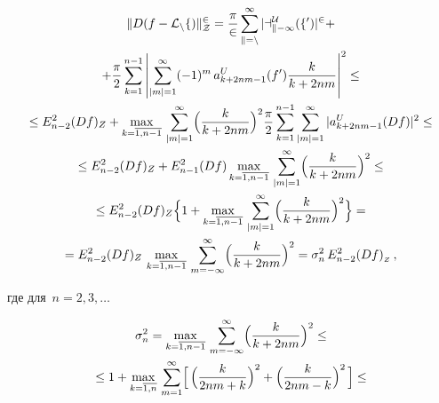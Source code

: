 \begin{pf}
\begin{gather}
\|D(f-\cal{L}_nf)\|_Z^2=\frac{\pi }{2}\sum_{k=n}^\infty


|a_{k-1}^U(f')|^2+\notag\\


%


+\frac{\pi}{2}\sum_{k=1}^{n-1}\left| \sum_{|m|=1}^\infty (-1)^m\,


a^U_{k+2nm-1}(f')\frac{k}{k+2nm}\right|^2\le\notag\\


%


\le E_{n-2}^2(Df)_Z+\max_{k=\overline{1,n-1}}\,


\sum_{|m|=1}^\infty \Bigl( \frac{k}{k+2nm}\Bigr)^2 


\frac{\pi }{2}\sum_{k=1}^{n-1}\sum_{|m|=1}^\infty |a^U_{k+2nm-1}(Df)|^2\le


\notag\\


%


\le E_{n-2}^2(Df)_Z+ E_{n-1}^2(Df) \max_{k=\overline{1,n-1}}\,


\sum_{|m|=1}^\infty \Bigl( \frac{k}{k+2nm}\Bigr)^2 \le\notag\\


%


\le E_{n-2}^2(Df)_Z\Bigl\{ 1+ \max_{k=\overline{1,n-1}}\,


\sum_{|m|=1}^\infty \Bigl( \frac{k}{k+2nm}\Bigr)^2 \Bigr\}=\notag\\


%


= E_{n-2}^2(Df)_Z \, \max_{k=\overline{1,n-1}}\,


\sum_{m=-\infty }^\infty \Bigl( \frac{k}{k+2nm}\Bigr)^2 =


\sigma_n^2\, E_{n-2}^2(Df)_{{}_Z}\,,


\end{gather}


где для $\, n=2,3,\dotsc $


\begin{gather}


\sigma_n^2=\max_{k=\overline{1,n-1}}\, \sum_{m=-\infty }^\infty


\Bigl( \frac{k}{k+2nm}\Bigr)^2\le\notag\\


%


\le 1+ \max_{k=\overline{1,n}}\, \sum_{m=1}^\infty \Bigl[\,


\Bigl(\frac{k}{2nm+k}\Bigr)^2 +\Bigl(\frac{k}{2nm-k}\Bigr)^2\, \Bigr]\le


\notag\\



\end{gather}
\end{pf}
